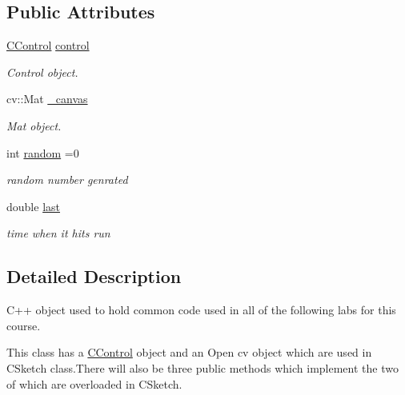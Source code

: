 \subsection*{Public Attributes}
\begin{DoxyCompactItemize}
\item 
\hypertarget{class_c_base4618_aa07dc8a46156de408c94acf90f46043a}{}\label{class_c_base4618_aa07dc8a46156de408c94acf90f46043a} 
\hyperlink{class_c_control}{C\+Control} \hyperlink{class_c_base4618_aa07dc8a46156de408c94acf90f46043a}{control}
\begin{DoxyCompactList}\small\item\em Control object. \end{DoxyCompactList}\item 
\hypertarget{class_c_base4618_a1b925f757247b33ca2072f777f24582d}{}\label{class_c_base4618_a1b925f757247b33ca2072f777f24582d} 
cv\+::\+Mat \hyperlink{class_c_base4618_a1b925f757247b33ca2072f777f24582d}{\+\_\+canvas}
\begin{DoxyCompactList}\small\item\em Mat object. \end{DoxyCompactList}\item 
\hypertarget{class_c_base4618_a9592c1ee1d746ebb8cbbf5389f8033ce}{}\label{class_c_base4618_a9592c1ee1d746ebb8cbbf5389f8033ce} 
int \hyperlink{class_c_base4618_a9592c1ee1d746ebb8cbbf5389f8033ce}{random} =0
\begin{DoxyCompactList}\small\item\em random number genrated \end{DoxyCompactList}\item 
\hypertarget{class_c_base4618_afdacbfdcf5e4dcbc0194f24eb1337b42}{}\label{class_c_base4618_afdacbfdcf5e4dcbc0194f24eb1337b42} 
double \hyperlink{class_c_base4618_afdacbfdcf5e4dcbc0194f24eb1337b42}{last}
\begin{DoxyCompactList}\small\item\em time when it hits run \end{DoxyCompactList}\end{DoxyCompactItemize}


\subsection{Detailed Description}
C++ object used to hold common code used in all of the following labs for this course. 

This class has a \hyperlink{class_c_control}{C\+Control} object and an Open cv object which are used in C\+Sketch class.\+There will also be three public methods which implement the two of which are overloaded in C\+Sketch.

